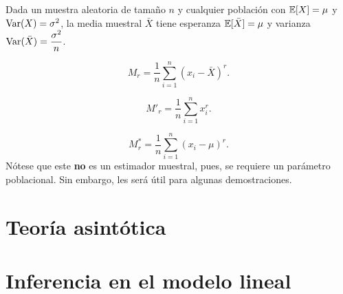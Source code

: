 \documentclass[8pt,a4paper]{extarticle}
\begin{document}
\begin{multicols}{3}
	\begin{boxtheo}
		Dada un muestra aleatoria de tamaño $n$ y cualquier población con $\mathbb{E} [X] = \mu$ y $\text{\normalfont Var}(X) = \sigma^2$, la media muestral $\bar{X}$ tiene esperanza $\mathbb{E} [\bar{X}] = \mu$ y varianza $\displaystyle \text{\normalfont Var}(\bar{X}) = \frac{\sigma^2}{n}$.
	\end{boxtheo}

	\begin{boxdef}
		\[M_r = \frac{1}{n}\sum_{i = 1}^n \left( x_i - \bar{X} \right)^r.\]
	\end{boxdef}

	\begin{boxdef}
		\[M'_r = \frac{1}{n}\sum_{i = 1}^n x_i^r.\]
	\end{boxdef}

	\begin{boxdef}
		\[M^*_r = \frac{1}{n}\sum_{i = 1}^n \left( x_i - \mu \right)^r.\]
		Nótese que este \textbf{no} es un estimador muestral, pues, se requiere un parámetro poblacional. Sin embargo, les será útil para algunas demostraciones.
	\end{boxdef}

	\newpage
	\section{Teoría asintótica}

	\newpage
	\section{Inferencia en el modelo lineal}

	\vfill\eject
	\columnbreak
\end{multicols}
\end{document}
